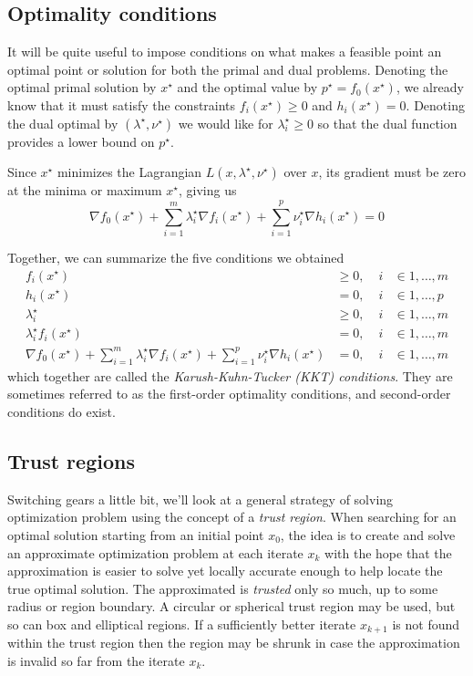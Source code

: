 \subsection{Optimality conditions}
It will be quite useful to impose conditions on what makes a feasible point an optimal point or solution for both the primal and dual problems. Denoting the optimal primal solution by $x^\star$ and the optimal value by $p^\star = f_0(x^\star)$, we already know that it must satisfy the constraints $f_i(x^\star) \ge 0$ and $h_i(x^\star) = 0$. Denoting the dual optimal by $(\lambda^\star, \nu^\star)$ we would like for $\lambda_i^\star \ge 0$ so that the dual function provides a lower bound on $p^\star$. 


Since $x^\star$ minimizes the Lagrangian $L(x, \lambda^\star, \nu^\star)$ over $x$, its gradient must be zero at the minima or maximum $x^\star$, giving us
\[
\nabla f_0(x^\star) + \sum_{i=1}^m \lambda_i^\star \nabla f_i(x^\star)
+ \sum_{i=1}^p \nu_i^\star \nabla h_i(x^\star) = 0
\]

Together, we can summarize the five conditions we obtained
\begin{align} \label{eq:kkt}
f_i(x^\star) & \geq 0, \; & i & \in {1,\dots,m} \nonumber \\
h_i(x^\star) & = 0, \; & i & \in {1,\dots,p} \nonumber \\
\lambda_i^\star & \geq 0, \; & i & \in {1,\dots,m} \\
\lambda_i^\star f_i(x^\star) & = 0, \; & i & \in {1,\dots,m} \nonumber \\
\nabla f_0(x^\star) + \sum_{i=1}^m \lambda_i^\star \nabla f_i(x^\star)
+ \sum_{i=1}^p \nu_i^\star \nabla h_i(x^\star) & = 0, \; & i & \in {1,\dots,m} \nonumber
\end{align}
which together are called the \emph{Karush-Kuhn-Tucker (KKT) conditions}. They are sometimes referred to as the first-order optimality conditions, and second-order conditions do exist.

\subsection{Trust regions}
Switching gears a little bit, we'll look at a general strategy of solving optimization problem using the concept of a \emph{trust region}. When searching for an optimal solution starting from an initial point $x_0$, the idea is to create and solve an approximate optimization problem at each iterate $x_k$ with the hope that the approximation is easier to solve yet locally accurate enough to help locate the true optimal solution. The approximated is \emph{trusted} only so much, up to some radius or region boundary. A circular or spherical trust region may be used, but so can box and elliptical regions. If a sufficiently better iterate $x_{k+1}$ is not found within the trust region then the region may be shrunk in case the approximation is invalid so far from the iterate $x_k$.

